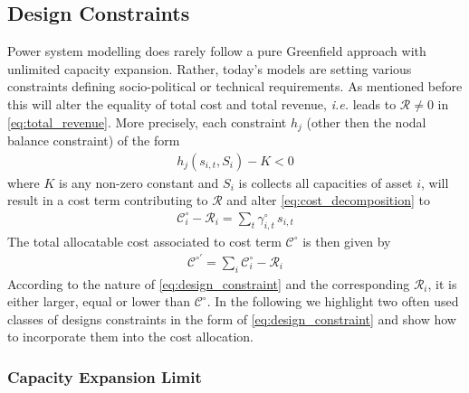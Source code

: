 \documentclass[11pt,twocolumn]{article}
\newcommand{\ie}{\textit{i.e.} }
\newcommand{\state}{s_{i,t}}
\newcommand{\capacity}{S_{i}}
\newcommand{\costfactor}{\gamma^\circ_{i,t}}
\newcommand{\cost}[1][\circ]{\mathcal{C}^{#1}}
\newcommand{\remainingcost}{\mathcal{R}}
\begin{document}
\subsection{Design Constraints}
\label{sec:design_constraints}
Power system modelling does rarely follow a pure Greenfield approach with unlimited capacity expansion. Rather, today's models are setting various constraints defining socio-political or  technical requirements. As mentioned before this will alter the equality of total cost and total revenue, \ie leads to $\remainingcost \ne 0$ in \cref{eq:total_revenue}. More precisely, each constraint $h_j$ (other then the nodal balance constraint) of the form 
\begin{align}
    h_j \left(\state, \capacity \right) - K < 0
    \label{eq:design_constraint}
\end{align}
where $K$ is any non-zero constant and $\capacity$ is collects all capacities of asset $i$, will result in a cost term contributing to $\remainingcost$ and alter \cref{eq:cost_decomposition} to 
\begin{align}
    \cost_i - \remainingcost_i = \sum_t \costfactor \, \state
\end{align}
The total allocatable cost associated to cost term $\cost$ is then given by 
\begin{align}
    \cost[\circ '] = \sum_i  \cost_i - \remainingcost_i
    \label{altered_cost}
\end{align}
According to the nature of \cref{eq:design_constraint} and the corresponding $\remainingcost_i$, it is either larger, equal or lower than $\cost$.  
In the following we highlight two often used classes of designs constraints in the form of \cref{eq:design_constraint} and show how to incorporate them into the cost allocation.  

\subsubsection{Capacity Expansion Limit}
\end{document}

